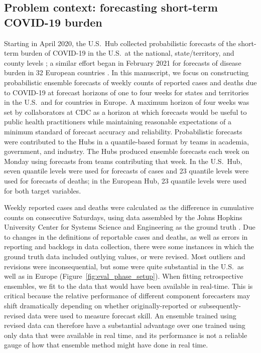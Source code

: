 \documentclass[11pt,3p,review,authoryear]{elsarticle}
\begin{document}
\subsection{Problem context: forecasting short-term COVID-19 burden}
\label{subsec:methods_context}

Starting in April 2020, the U.S.\ Hub collected probabilistic forecasts of the short-term burden of COVID-19 in the U.S.\ at the national, state/territory, and county levels \citep{cramer_united_2021}; a similar effort began
in February 2021 for forecasts of disease burden in 32 European countries \citep{EuropeanCovid19Forecast}.
In this manuscript, we focus on constructing probabilistic ensemble forecasts of weekly counts of reported cases and deaths due to COVID-19 at forecast horizons of one to four weeks for states and territories in the U.S.\ and for countries in Europe.
A maximum horizon of four weeks was set by collaborators at CDC as a horizon at which forecasts would be useful to public health practitioners while maintaining reasonable expectations of a minimum standard of forecast accuracy and reliability.
Probabilistic forecasts were contributed to the Hubs in a quantile-based format by teams in academia, government, and industry.
The Hubs produced ensemble forecasts each week on Monday using forecasts from teams contributing that week.
In the U.S.\ Hub, seven quantile levels were used for forecasts of cases and 23 quantile levels were used for forecasts of deaths; in the European Hub, 23 quantile levels were used for both target variables. %

Weekly reported cases and deaths were calculated as the difference in cumulative counts on consecutive Saturdays, using data assembled by the Johns Hopkins University Center for Systems Science and Engineering as the ground truth \citep{dong_interactive_2020}.
Due to changes in the definitions of reportable cases and deaths, as well as errors in reporting and backlogs in data collection, there were some instances in which the ground truth data included outlying values, or were revised. Most outliers and revisions were inconsequential, but some were quite substantial in the U.S.\ as well as in Europe (Figure~\ref{fig:eval_phase_setup}).
When fitting retrospective ensembles, we fit to the data that would have been available in real-time.
This is critical because the relative performance of different component forecasters may shift dramatically depending on whether originally-reported or subsequently-revised data were used to measure forecast skill.
An ensemble trained using revised data can therefore have a substantial advantage over one trained using only data that were available in real time, and its performance is not a reliable gauge of how that ensemble method might have done in real time.
\end{document}
